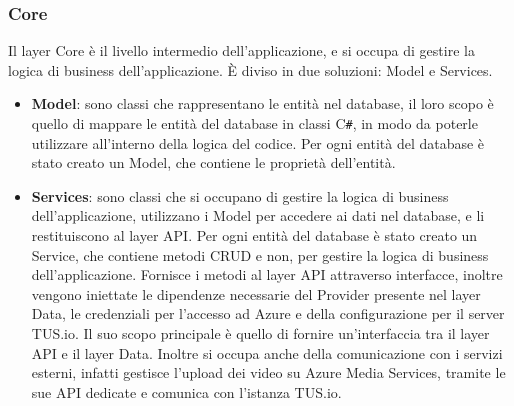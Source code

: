 \subsubsection{Core}
Il layer Core è il livello intermedio dell'applicazione, e si occupa di gestire la logica di business dell'applicazione. È diviso in due soluzioni: Model e Services.\\
\begin{itemize}
    \item \textbf{Model}: sono classi che rappresentano le entità nel database, il loro scopo è quello di mappare le entità del database in classi C\texttt{\#}, in modo da poterle utilizzare all'interno della logica del codice. Per ogni entità del database è stato creato un Model, che contiene le proprietà dell'entità.\\
    \item \textbf{Services}: sono classi che si occupano di gestire la logica di business dell'applicazione, utilizzano i Model per accedere ai dati nel database, e li restituiscono al layer API. Per ogni entità del database è stato creato un Service, che contiene  metodi CRUD e non, per gestire la logica di business dell'applicazione. Fornisce i metodi al layer API attraverso interfacce, inoltre vengono iniettate le dipendenze necessarie del Provider presente nel layer Data, le credenziali per l'accesso ad Azure e della configurazione per il server TUS.io. Il suo scopo principale è quello di fornire un'interfaccia tra il layer API e il layer Data. Inoltre si occupa anche della comunicazione con i servizi esterni, infatti gestisce l'upload dei video su Azure Media Services, tramite le sue API dedicate e comunica con l'istanza TUS.io.\\
\end{itemize}
